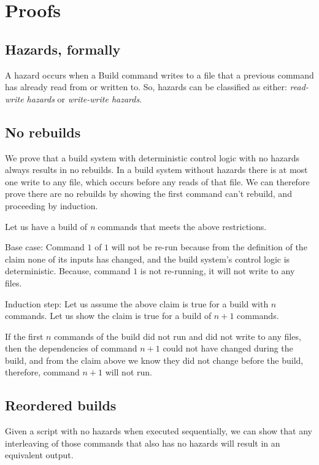 \section{Proofs}
\label{sec:proof}

\subsection{Hazards, formally}

A hazard occurs when a Build command writes to a file that a previous command has already read from or written to.  So, hazards can be classified as either: \emph{read-write hazards} or \emph{write-write hazards}.  

\subsection{No rebuilds}
\label{sec:proof:no_rebuild}

We prove that a build system with deterministic control logic with no hazards always results in no rebuilds.
In a build system without hazards there is at most one write to any file, which occurs before any reads of that file. We can therefore prove there are no rebuilds by showing the first command can't rebuild, and proceeding by induction.

Let us have a build of \emph{n} commands that meets the above restrictions.  

Base case: Command $1$ of $1$  will not be re-run because from the definition of the claim none of its inputs has changed, and the build system's control logic is deterministic.  Because, command $1$ is not re-running, it will not write to any files.  

Induction step:  Let us assume the above claim is true for a build with $n$ commands.  Let us show the claim is true for a build of $n+1$ commands.

If the first $n$ commands of the build did not run and did not write to any files, then the dependencies of command $n+1$ could not have changed during the build, and from the claim above we know they did not change before the build, therefore, command $n+1$ will not run.

\subsection{Reordered builds}
\label{sec:proof:reorder}

Given a script with no hazards when executed sequentially, we can show that any interleaving of those commands that also has no hazards will result in an equivalent output.

